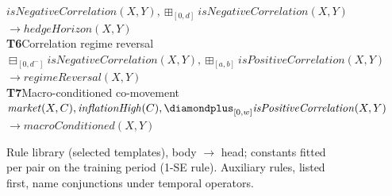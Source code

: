 \begin{figure}[t]
{\begin{minipage}{0.95\textwidth}
\hspace*{1.5em}\mbox{$\mathit{isNegativeCorrelation}(X,Y), \boxplus_{[0,d]} \mathit{isNegativeCorrelation}(X,Y)$}\\
\hspace*{1.5em}\hspace*{3em}\mbox{$\to \mathit{hedgeHorizon}(X,Y)$}\\[5pt]
\textbf{T6}\quad Correlation regime reversal~\cite{ang2002regimeshifts}\\
\hspace*{1.5em}\mbox{$\boxminus_{[0, d^{-}]}\mathit{isNegativeCorrelation}(X,Y), \boxplus_{[a,b]}\mathit{isPositiveCorrelation}(X,Y)$}\\
\hspace*{1.5em}\hspace*{3em}\mbox{$\to \mathit{regimeReversal}(X,Y)$}\\[5pt]
\textbf{T7}\quad Macro-conditioned co-movement~\cite{bekaert2013risk}\hspace{1em plus 1fill}{\footnotesize (fitted constants: $w$)}\\
\hspace*{1.5em}\mbox{$\mathit{market}(X,C), \mathit{inflationHigh}(C), \diamondplus_{[0,w]} \mathit{isPositiveCorrelation}(X,Y)$}\\
\hspace*{1.5em}\hspace*{3em}\mbox{$\to \mathit{macroConditioned}(X,Y)$}
\end{minipage}}
\caption{\small{Rule library (selected templates), body $\to$ head; constants fitted per pair on the training period (1-SE rule). Auxiliary rules, listed first, name conjunctions under temporal operators.}}
\label{fig:rule-library-pub}
\end{figure}
